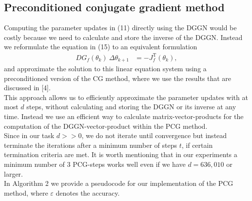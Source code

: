 \documentclass[conference]{IEEEtran}
\begin{document}
\subsection{Preconditioned conjugate gradient method}
\noindent
Computing the parameter updates in (11) directly using the DGGN would be costly because we need to calculate and store the inverse of the DGGN. Instead we reformulate the equation in (15) to an equivalent formulation
\begin{align}
DG_{f}(\theta_{k})\: \Delta\theta_{k+1} &= -J_{f}^{\mathrm{T}}(\theta_{k}),
\end{align}
and approximate the solution to this linear equation system using a preconditioned version of the CG method, where we use the results that are discussed in [4]. \\
This approach allows us to efficiently approximate the parameter updates with at most $d$ steps, without calculating and storing the DGGN or its inverse at any time. Instead we use an efficient way to calculate matrix-vector-products for the computation of the DGGN-vector-product within the PCG method.\\
Since in our task $d>>0$, we do not iterate until convergence but instead terminate the iterations after a minimum number of steps $t$, if certain termination criteria are met. It is worth mentioning that in our experiments a minimum number of 3 PCG-steps works well even if we have $d=636,010$ or larger. \\
In Algorithm 2 we provide a pseudocode for our implementation of the PCG method, where $\varepsilon$ denotes the accuracy.
\end{document}
